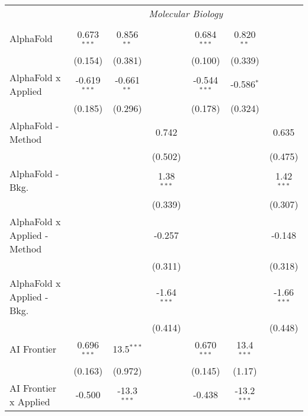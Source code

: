 \begin{tabular}{lcccccc}
 & \multicolumn{6}{c}{\textit{Molecular Biology}} \\ \\
   AlphaFold                      & 0.673$^{***}$  & 0.856$^{**}$  &               & 0.684$^{***}$  & 0.820$^{**}$  &   \\   
                                  & (0.154)        & (0.381)       &               & (0.100)        & (0.339)       &   \\   
   AlphaFold x Applied            & -0.619$^{***}$ & -0.661$^{**}$ &               & -0.544$^{***}$ & -0.586$^{*}$  &   \\   
                                  & (0.185)        & (0.296)       &               & (0.178)        & (0.324)       &   \\   
   AlphaFold - Method             &                &               & 0.742         &                &               & 0.635\\   
                                  &                &               & (0.502)       &                &               & (0.475)\\   
   AlphaFold - Bkg.               &                &               & 1.38$^{***}$  &                &               & 1.42$^{***}$\\   
                                  &                &               & (0.339)       &                &               & (0.307)\\   
   AlphaFold x Applied - Method   &                &               & -0.257        &                &               & -0.148\\   
                                  &                &               & (0.311)       &                &               & (0.318)\\   
   AlphaFold x Applied - Bkg.     &                &               & -1.64$^{***}$ &                &               & -1.66$^{***}$\\   
                                  &                &               & (0.414)       &                &               & (0.448)\\   
   AI Frontier                    & 0.696$^{***}$  & 13.5$^{***}$  &               & 0.670$^{***}$  & 13.4$^{***}$  &   \\   
                                  & (0.163)        & (0.972)       &               & (0.145)        & (1.17)        &   \\   
   AI Frontier x Applied          & -0.500         & -13.3$^{***}$ &               & -0.438         & -13.2$^{***}$ &   \\   

\end{tabular}
